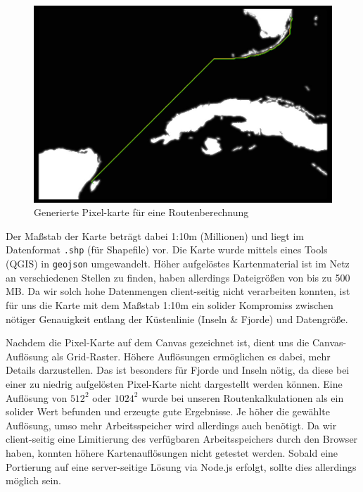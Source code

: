 \documentclass[letterpaper]{article}
\begin{document}
	\begin{figure}[!htbp]
		\centering
		\includegraphics[width=\linewidth]{pixel_map_miami}
		\caption{Generierte Pixel-karte für eine Routenberechnung}
		\label{fig:Pixel Map Miami}
	\end{figure}

	Der Maßstab der Karte beträgt dabei 1:10m (Millionen) und liegt im Datenformat \texttt{.shp} (für Shapefile) vor. Die Karte wurde mittels eines Tools (QGIS) in \texttt{geojson} umgewandelt. Höher aufgelöstes Kartenmaterial ist im Netz an verschiedenen Stellen zu finden\footnotemark, haben allerdings Dateigrößen von bis zu 500 MB. Da wir solch hohe Datenmengen client-seitig nicht verarbeiten konnten, ist für uns die Karte mit dem Maßstab 1:10m ein solider Kompromiss zwischen nötiger Genauigkeit entlang der Küstenlinie (Inseln \& Fjorde) und Datengröße.


	Nachdem die Pixel-Karte auf dem Canvas gezeichnet ist, dient uns die Canvas-Auflösung als Grid-Raster. Höhere Auflösungen ermöglichen es dabei, mehr Details darzustellen. Das ist besonders für Fjorde und Inseln nötig, da diese bei einer zu niedrig aufgelösten Pixel-Karte nicht dargestellt werden können. Eine Auflösung von $512^2$ oder $1024^2$ wurde bei unseren Routenkalkulationen als ein solider Wert befunden und erzeugte gute Ergebnisse. Je höher die gewählte Auflösung, umso mehr Arbeitsspeicher wird allerdings auch benötigt. Da wir client-seitig eine Limitierung des verfügbaren Arbeitsspeichers durch den Browser haben, konnten höhere Kartenauflösungen nicht getestet werden. Sobald eine Portierung auf eine server-seitige Lösung via Node.js erfolgt, sollte dies allerdings möglich sein.
\end{document}
